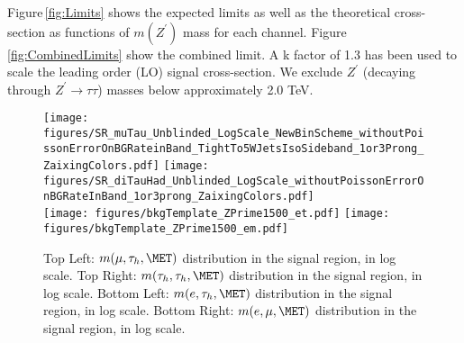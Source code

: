 Figure\,\ref{fig:Limits} shows the expected limits as well as the theoretical cross-section as functions of $m(Z^{\prime})$ mass for each channel. 
Figure\,\ref{fig:CombinedLimits} show the combined limit. A k factor of 1.3 has been used to scale the leading order (LO) signal cross-section. 
We exclude $Z^{\prime}$ (decaying through $Z^{\prime}\to\tau\tau$) masses below approximately 2.0 TeV. 

\begin{figure}[tbh!]
  \centering
   \texttt{[image: figures/SR\_muTau\_Unblinded\_LogScale\_NewBinScheme\_withoutPoissonErrorOnBGRateinBand\_TightTo5WJetsIsoSideband\_1or3Prong\_ZaixingColors.pdf]}
   \texttt{[image: figures/SR\_diTauHad\_Unblinded\_LogScale\_withoutPoissonErrorOnBGRateInBand\_1or3prong\_ZaixingColors.pdf]} \\
   \texttt{[image: figures/bkgTemplate\_ZPrime1500\_et.pdf]}
   \texttt{[image: figures/bkgTemplate\_ZPrime1500\_em.pdf]}
  \caption{ Top Left: $m(\mu,\tau_{h},\MET)$ distribution in the signal region, in log scale.  Top Right: $m(\tau_{h},\tau_{h},\MET)$ distribution in 
the signal region, in log scale.  Bottom Left: $m(e,\tau_{h},\MET)$ distribution in the signal region, in log scale.  Bottom Right: $m(e,\mu,\MET)$ 
distribution in the signal region, in log scale.}
    \label{fig:SignalRegionPlot_a}
\end{figure}

